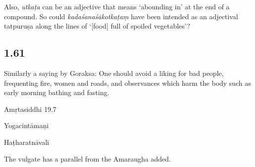 \begin{ekdosis}
\begin{philcomm}[hp01_060]
Also, \emph{utkaṭa} can be an adjective that means ‘abounding in’ at the end of a compound. So could \emph{kadaśanaśākotkaṭaṃ} have been intended as an adjectival tatpuruṣa along the lines of ‘[food] full of spoiled vegetables’?
\end{philcomm}

\subsection*{1.61}
\begin{translation}[hp01_061]
Similarly a saying by Goraksa:
One should avoid a liking for bad people, frequenting fire, women and roads, and observances which harm the body such as early morning bathing and fasting.
\end{translation}

\begin{sources}[hp01_061]
Amṛtasiddhi 19.7

\begin{versinnote}
\end{versinnote}

\end{sources}

\begin{testimonia}[hp01_061]
Yogacintāmaṇi

\begin{versinnote}
\end{versinnote}

Haṭharatnāvalī

\begin{versinnote}
\end{versinnote}

\end{testimonia}

\begin{philcomm}[hp01_061]
The vulgate has a parallel from the Amaraugha added. 
\end{philcomm}


\end{ekdosis}
